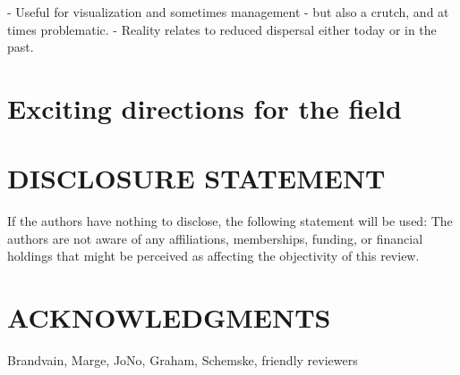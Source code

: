 \documentclass{ar-1col}
\begin{document}
    - Useful for visualization and sometimes management
    - but also a crutch, and at times problematic.
    - Reality relates to reduced dispersal either today or in the past.


\section{Exciting directions for the field}

\section*{DISCLOSURE STATEMENT}
If the authors have nothing to disclose, the following statement will be used: The authors are not aware of any affiliations, memberships, funding, or financial holdings that
might be perceived as affecting the objectivity of this review. 

\section*{ACKNOWLEDGMENTS}
Brandvain, Marge, JoNo, Graham, Schemske, friendly reviewers
\end{document}
